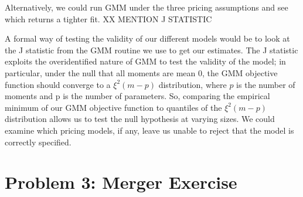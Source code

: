 \documentclass{article}
\begin{document}
\begin{enumerate}
\begin{enumerate}
\begin{answer}
Alternatively, we could run GMM under the three pricing assumptions and see which returns a tighter fit. XX MENTION J STATISTIC

A formal way of testing the validity of our different models would be to look at the J statistic from the GMM routine we use to get our estimates. The J statistic exploits the overidentified nature of GMM to test the validity of the model; in particular, under the null that all moments are mean 0, the GMM objective function should converge to a $\xi^2(m-p)$ distribution, where $p$ is the number of moments and p is the number of parameters. So, comparing the empirical minimum of our GMM objective function to quantiles of the $\xi^2(m-p)$  distribution allows us to test the null hypothesis at varying sizes. We could examine which pricing models, if any, leave us unable to reject that the model is correctly specified. 
\end{answer}

\end{enumerate}

\end{enumerate}

\section*{Problem 3: Merger Exercise}
\end{document}
